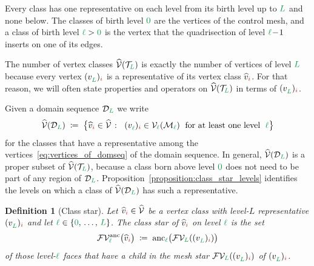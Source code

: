 \documentclass[a4paper, 12pt]{article}
\makeatletter
\newcommand{\green}{\color{ForestGreen}}
\newcommand{\brickred}{\color{BrickRed}}
\newcommand{\T}{\mathcal{T}}
\newcommand{\V}{\mathcal{V}}
\newcommand{\F}{\mathcal{F}}
\newcommand{\vertex}[2]{\freeQ{v}{}{#1}{#2}}
\newcommand{\vertexClass}[1]{\widehat{v}_{#1}}
\newcommand{\vertexClasses}{\widehat{\V}}
\newcommand{\FVl}[1]{\F\V_{#1}}
\newcommand{\coarseIdxone}{{\brickred i}}
\renewcommand{\l}{{\green\ell}}
\renewcommand{\L}{{\green L}}
\newcommand{\lzero}{{\green 0}}
\newcommand{\freeQ}[4]{ ( {#1}^{#2}_{#3} )_{#4}}
\newcommand{\M}{\mathcal{M}}
\newtheorem{definition}[theorem]{Definition}
\theoremstyle{definition}
\theoremstyle{plain}
\numberwithin{equation}{section}
\DeclareRobustCommand{\domseq}[1][]{\mathcal{D}\ifx\@empty#1\@empty\else_{#1}\fi}
\newcommand{\anc}[1]{\mathrm{anc}_{#1}}                     %
\newcommand{\FVanc}[1]{\F\V^{\mathrm{anc}}_{#1}}            %
\makeatother
\begin{document}
Every class has one representative on each level from its birth level up to $\L$ and none below. The classes of birth level $\lzero$ are the vertices of the control mesh, and a class of birth level $\l > \lzero$ is the vertex that the quadrisection of level $\l \! - \! 1$ inserts on one of its edges.

The number of vertex classes $\vertexClasses(\T_\L)$ is exactly the number of vertices of level $\L$ because every vertex $\vertex{\L}{\coarseIdxone}$ is a representative of its vertex class $\vertexClass{\coarseIdxone}$. For that reason, we will often state properties and operators on $\vertexClasses(\T_\L)$ in terms of $\vertex{\L}{\coarseIdxone}$.

Given a domain sequence $\domseq[\L]$ we write
\begin{equation}
    \label{eq:vertex_classes_of_domseq}
    \vertexClasses(\domseq[\L]) \; \coloneq \; \big\{ \vertexClass{\coarseIdxone} \in \vertexClasses \; \colon \;\; \vertex{\l}{\coarseIdxone} \in \V_\l(\M_\l) \;\text{ for at least one level }\; \l \big\}
\end{equation}
for the classes that have a representative among the vertices~\eqref{eq:vertices_of_domseq} of the domain sequence. In general, $\vertexClasses(\domseq[\L])$ is a proper subset of $\vertexClasses(\T_\L)$, because a class born above level $\lzero$ does not need to be part of any region of $\domseq[\L]$. Proposition~\ref{proposition:class_star_levels} identifies the levels on which a class of $\vertexClasses(\domseq[\L])$ has such a representative.

\begin{definition}[Class star]
    \label{def:star_ancestry}
    Let $\vertexClass{\coarseIdxone} \in \vertexClasses$ be a vertex class with level-$L$ representative $\vertex{\L}{\coarseIdxone}$ and let $\l \in \{ \lzero, \, \dots, \, \L \}$. The \emph{class star} of $\vertexClass{\coarseIdxone}$ on level $\l$ is the set
    \begin{equation}
        \label{eq:star_ancestry}
        \FVanc{\l} \big( \vertexClass{\coarseIdxone} \big) \; \coloneq \; \anc{\l} \big( \FVl{\L} ( \vertex{\L}{\coarseIdxone} ) \big)
    \end{equation}
    of those level-$\l$ faces that have a child in the mesh star $\FVl{\L}(\vertex{\L}{\coarseIdxone})$ of $\vertex{\L}{\coarseIdxone}$.
\end{definition}
\end{document}
